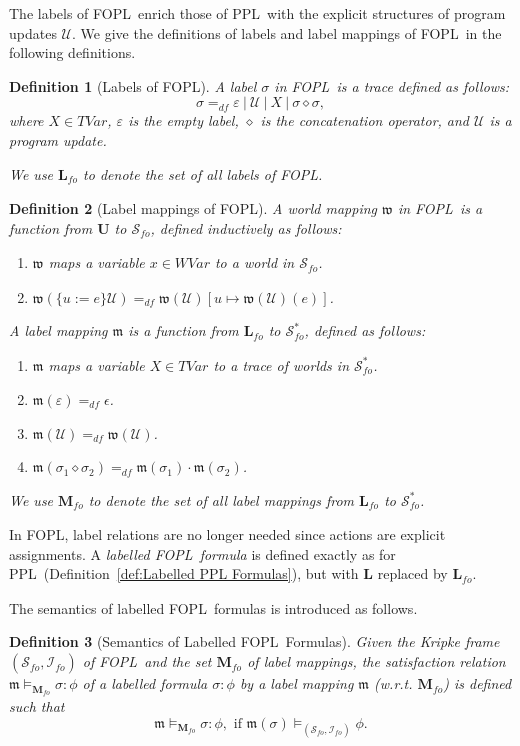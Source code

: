 \documentclass[manuscript,screen]{acmart}
\newtheorem{definition}{Definition}[section]
\newcommand{\bff}[1]{\mathbf{#1}}
\newcommand{\mcl}[1]{\mathcal{#1}}
\newcommand{\mfr}[1]{\mathfrak{#1}}
\newcommand{\dddef}[0]{=_{df}}
\newcommand{\Conf}[0]{\bff{L}}
\newcommand{\lm}[0]{\mfr{m}}
\newcommand{\cat}[0]{\diamond}
\newcommand{\Wd}[0]{\mcl{S}}
\newcommand{\I}[0]{\mcl{I}}
\newcommand{\LM}[0]{\bff{M}}
\newcommand{\fo}[0]{{\textit{fo}}}
\newcommand{\WVar}[0]{\textit{WVar}}
\newcommand{\TVar}[0]{\textit{TVar}}
\newcommand{\Upd}[0]{\textbf{U}}
\newcommand{\wm}[0]{\mfr{w}}
\newcommand{\upd}[0]{\mcl{U}}
\newcommand{\PPL}[0]{\mbox{PPL}}
\newcommand{\FOPL}[0]{\mbox{FOPL}}
\begin{document}
The labels of \FOPL\ enrich those of \PPL\ with the explicit structures of program updates $\upd$. 
We give the definitions of labels and label mappings of \FOPL\ in the following definitions.


\begin{definition}[Labels of \FOPL]
A label $\sigma$ in \FOPL\ is a trace defined as follows:
$$
\sigma \dddef \varepsilon\ |\ \upd\ |\ X\ |\ \sigma\cat\sigma,
$$
where $X\in \TVar$, $\varepsilon$ is the empty label, $\cat$ is the concatenation operator, and $\upd$ is a program update. 

We use $\Conf_\fo$ to denote the set of all labels of \FOPL.
\end{definition}


\begin{definition}[Label mappings of \FOPL]
A world mapping $\wm$ in \FOPL\ is a function from $\Upd$ to $\Wd_{\fo}$, defined inductively as follows:
\begin{enumerate}
\item $\wm$ maps a variable $x\in \WVar$ to a world in $\Wd_{\fo}$. 
\item $\wm(\{u := e\}\upd)\dddef \wm(\upd)[u\mapsto \wm(\upd)(e)]$. 
\end{enumerate}
A label mapping $\lm$ is a function from $\Conf_\fo$ to $\Wd^*_{\fo}$, defined as follows:
\begin{enumerate}[i]
\item $\lm$ maps a variable $X\in\TVar$ to a trace of worlds in $\Wd^*_{\fo}$.
\item $\lm(\varepsilon)\dddef \epsilon$.
\item $\lm(\upd)\dddef \wm(\upd)$.
\item $\lm(\sigma_1\cat \sigma_2)\dddef \lm(\sigma_1)\cdot\lm(\sigma_2)$.
\end{enumerate} 
We use $\LM_\fo$ to denote the set of all label mappings from $\Conf_\fo$ to $\Wd^*_{\fo}$.
\end{definition}


In \FOPL, label relations are no longer needed since actions are explicit assignments. 
A \emph{labelled \FOPL\ formula} is defined exactly as for \PPL\ (Definition~\ref{def:Labelled PPL Formulas}), but with $\Conf$ replaced by $\Conf_\fo$. 



The semantics of labelled \FOPL\ formulas is introduced as follows. 


\begin{definition}[Semantics of Labelled \FOPL\ Formulas]
Given the Kripke frame $(\Wd_\fo, \I_\fo)$ of \FOPL\ and the set $\LM_\fo$ of label mappings, the satisfaction relation $\lm\models_{\LM_\fo}\sigma : \phi$ of a labelled formula $\sigma : \phi$ by a label mapping $\lm$ (w.r.t. $\LM_\fo$) is defined such that
$$
\lm\models_{\LM_\fo}\sigma : \phi, \mbox{ if } \lm(\sigma) \models_{(\Wd_\fo, \I_\fo)} \phi. 
$$
\end{definition}
\end{document}
